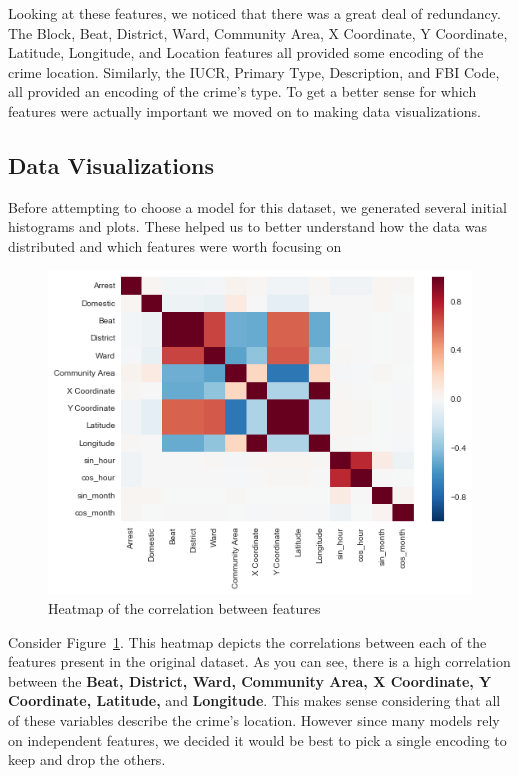 \documentclass[10pt]{SelfArx} %
\begin{document}
    Looking at these features, we noticed that there was a great deal of redundancy. The Block, Beat, District, Ward, Community Area, X Coordinate, Y Coordinate, Latitude, Longitude, and Location features all provided some encoding of the crime location. Similarly, the IUCR, Primary Type, Description, and FBI Code, all provided an encoding of the crime's type. To get a better sense for which features were actually important we moved on to making data visualizations.

    \subsection{Data Visualizations}
    Before attempting to choose a model for this dataset, we generated several initial histograms and plots. These helped us to better understand how the data was distributed and which features were worth focusing on

    \begin{figure}[h]
      \includegraphics[width=\linewidth]{FinalVisualizations/correlation.png}
      \caption{Heatmap of the correlation between features}
      \label{fig:corr}
    \end{figure}

    Consider Figure~\ref{fig:corr}. This heatmap depicts the correlations between each of the features present in the original dataset. As you can see, there is a high correlation between the \textbf{Beat, District, Ward, Community Area, X Coordinate, Y Coordinate, Latitude,} and \textbf{Longitude}. This makes sense considering that all of these variables describe the crime's location. However since many models rely on independent features, we decided it would be best to pick a single encoding to keep and drop the others.
\end{document}
